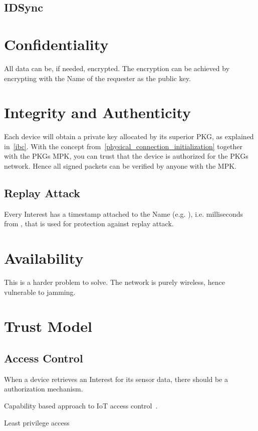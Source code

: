 \subsection{IDSync}

\section{Confidentiality}

All data can be, if needed, encrypted.
The encryption can be achieved by encrypting with the Name of the requester as the public key.


\section{Integrity and Authenticity}

Each device will obtain a private key allocated by its superior \gls{PKG}, as explained in~\autoref{ibc}.
With the concept from~\autoref{physical_connection_initialization} together with the \gls{PKG}s \gls{MPK}, you can trust that the device is authorized for the \gls{PKG}s network. Hence all signed packets can be verified by anyone with the \gls{MPK}.

\subsection{Replay Attack}
Every Interest has a timestamp attached to the Name (e.g. ), i.e. milliseconds from , that is used for protection against replay attack. 


\section{Availability}

This is a harder problem to solve.
The network is purely wireless, hence vulnerable to jamming. 

\section{Trust Model}


\subsection{Access Control}

When a device retrieves an Interest for its sensor data, there should be a authorization mechanism. 


Capability based approach to \gls{IoT} access control~\cite{DBLP:conf/imis/GusmeroliPR12}.

Least privilege access